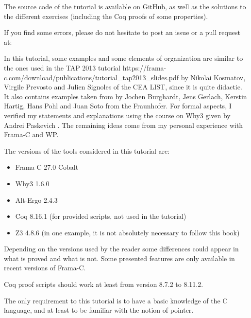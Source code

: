 \begin{Warning}
  The source code of
  the tutorial is available on GitHub, as well as the solutions to the
  different exercises (including the Coq proofs of some properties).

  If you find some errors, please do not hesitate to post an issue or
  a pull request at:

\end{Warning}


\begin{Information}
  In this tutorial, some examples and some elements of organization are
  similar to the ones used in the
  \externalLink
      {TAP 2013 tutorial}
      {https://frama-c.com/download/publications/tutorial_tap2013_slides.pdf}
  by Nikolai Kosmatov, Virgile Prevosto and Julien
  Signoles of the CEA LIST, since it is quite didactic. It also
  contains examples taken from
  \textit{}
  by Jochen Burghardt, Jens Gerlach, Kerstin Hartig, Hans Pohl and Juan
  Soto from the Fraunhofer. For formal aspects, I verified my statements and
  explanations using the course on Why3 given by Andrei Paskevich
  \textit{}.
  The remaining ideas come from my personal experience with Frama-C and WP.

  \horizontalLine

  The versions of the tools considered in this tutorial are:
  \begin{itemize}
  \item Frama-C 27.0 Cobalt
  \item Why3 1.6.0
  \item Alt-Ergo 2.4.3
  \item Coq 8.16.1 (for provided scripts, not used in the tutorial)
  \item Z3 4.8.6 (in one example, it is not absolutely necessary to follow this book)
  \end{itemize}
  Depending on the versions used by the reader some differences could appear in
  what is proved and what is not. Some presented features are only available
  in recent versions of Frama-C.

  Coq proof scripts should work at least from version 8.7.2 to 8.11.2.

  \horizontalLine

  The only requirement to this tutorial is to have a basic knowledge of the C
  language, and at least to be familiar with the notion of pointer.
\end{Information}

